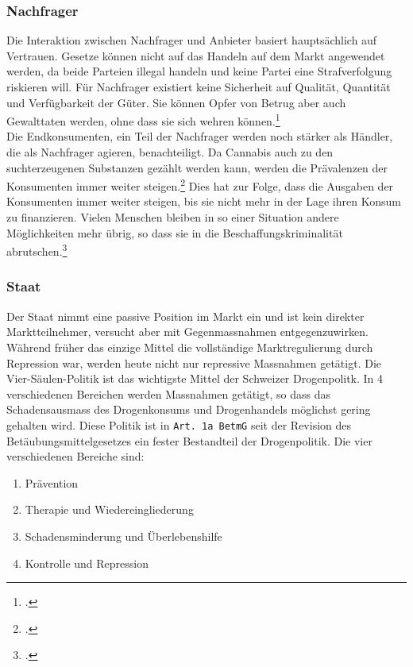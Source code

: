 \documentclass[../main.tex]{subfiles}
\begin{document}
	
	\subsubsection{Nachfrager}
	Die Interaktion zwischen Nachfrager und Anbieter basiert hauptsächlich auf Vertrauen.
	Gesetze können nicht auf das Handeln auf dem Markt angewendet werden, da beide Parteien illegal handeln und keine Partei eine Strafverfolgung riskieren will.
	Für Nachfrager existiert keine Sicherheit auf Qualität, Quantität und Verfügbarkeit der Güter.
	Sie können Opfer von Betrug aber auch Gewalttaten werden, ohne dass sie sich wehren können.\footcite{departmentofjustice-1994}\\
	
	\noindent	
	Die Endkonsumenten, ein Teil der Nachfrager werden noch stärker als Händler, die als Nachfrager agieren, benachteiligt.
	Da Cannabis auch zu den suchterzeugenen Substanzen gezählt werden kann, werden die Prävalenzen der Konsumenten immer weiter steigen.\footcite{becker}
	Dies hat zur Folge, dass die Ausgaben der Konsumenten immer weiter steigen, bis sie nicht mehr in der Lage ihren Konsum zu finanzieren.
	Vielen Menschen bleiben in so einer Situation andere Möglichkeiten mehr übrig, so dass sie in die Beschaffungskriminalität abrutschen.\footcite{departmentofjustice-1994}
	
	
	\subsubsection{Staat}
	Der Staat nimmt eine passive Position im Markt ein und ist kein direkter Marktteilnehmer, versucht aber mit Gegenmassnahmen entgegenzuwirken.
	Während früher das einzige Mittel die vollständige Marktregulierung durch Repression war, werden heute nicht nur repressive Massnahmen getätigt.
	Die Vier-Säulen-Politik ist das wichtigste Mittel der Schweizer Drogenpolitk. 
	In 4 verschiedenen Bereichen werden Massnahmen getätigt, so dass das Schadensausmass des Drogenkonsums und Drogenhandels möglichst gering gehalten wird.
	Diese Politik ist in \texttt{Art. 1a BetmG} seit der Revision des Betäubungsmittelgesetzes ein fester Bestandteil der Drogenpolitik.
	Die vier verschiedenen Bereiche sind:
	
	\begin{singlespacing}
	\begin{enumerate}
		\item Prävention
		\item Therapie und Wiedereingliederung
		\item Schadensminderung und Überlebenshilfe
		\item Kontrolle und Repression
	\end{enumerate}
	\end{singlespacing}    
    
\end{document}

